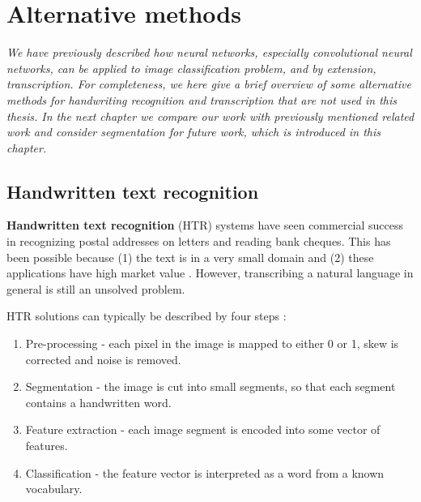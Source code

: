 
\chapter{Alternative methods}
\textit{ We have previously described how neural networks, especially convolutional neural networks, can be applied to image classification problem, and by extension, transcription.
For completeness, we here give a brief overview of some alternative methods for handwriting recognition and transcription that are not used in this thesis.
In the next chapter we compare our work with previously mentioned related work and consider segmentation for future work, which is introduced in this chapter.
}



\section{Handwritten text recognition} \label{sec:alt_htr}

\textbf{Handwritten text recognition} (HTR) systems have
seen commercial success in
recognizing postal addresses on letters \cite{lecun_1989, zipcode_system} and reading bank cheques. This has been possible because (1) the text is in a very small domain and (2) these applications have high market value \cite{40_years_HWR}. However, transcribing a natural language in general is still an unsolved problem.

HTR solutions can typically be described by four steps \cite{offline_HWR_CNN}:
\begin{enumerate}
    \item Pre-processing - each pixel in the image is mapped to either 0 or 1, skew is corrected and noise is removed.
    \item Segmentation - the image is cut into small segments, so that each segment contains a handwritten word.
    \item Feature extraction - each image segment is encoded into some vector of features.
    \item Classification - the feature vector is interpreted as a word from a known vocabulary.
\end{enumerate}

